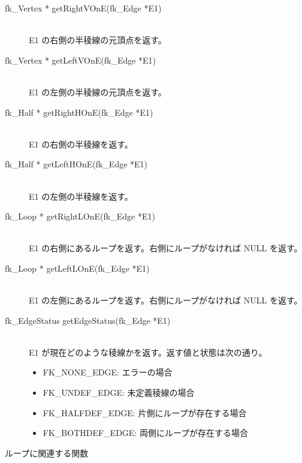 \begin{description}
 \item[\hspace*{0.6cm}fk\_Vertex * getRightVOnE(fk\_Edge *E1)] ~ \\
	E1 の右側の半稜線の元頂点を返す。

 \item[\hspace*{0.6cm}fk\_Vertex * getLeftVOnE(fk\_Edge *E1)] ~ \\
	E1 の左側の半稜線の元頂点を返す。

 \item[\hspace*{0.6cm}fk\_Half * getRightHOnE(fk\_Edge *E1)] ~ \\
	E1 の右側の半稜線を返す。

 \item[\hspace*{0.6cm}fk\_Half * getLeftHOnE(fk\_Edge *E1)] ~ \\
	E1 の左側の半稜線を返す。

 \item[\hspace*{0.6cm}fk\_Loop * getRightLOnE(fk\_Edge *E1)] ~ \\
	E1 の右側にあるループを返す。右側にループがなければ
	NULL を返す。

 \item[\hspace*{0.6cm}fk\_Loop * getLeftLOnE(fk\_Edge *E1)] ~ \\
	E1 の左側にあるループを返す。右側にループがなければ
	NULL を返す。

 \item[\hspace*{0.6cm}fk\_EdgeStatus getEdgeStatus(fk\_Edge *E1)] ~ \\
	E1 が現在どのような稜線かを返す。返す値と状態は次の通り。
	\begin{itemize}
	 \item FK\_NONE\_EDGE: エラーの場合
	 \item FK\_UNDEF\_EDGE: 未定義稜線の場合
	 \item FK\_HALFDEF\_EDGE: 片側にループが存在する場合
	 \item FK\_BOTHDEF\_EDGE: 両側にループが存在する場合
	\end{itemize}
\end{description}
\begin{center}
{\large ループに関連する関数}
\end{center}
